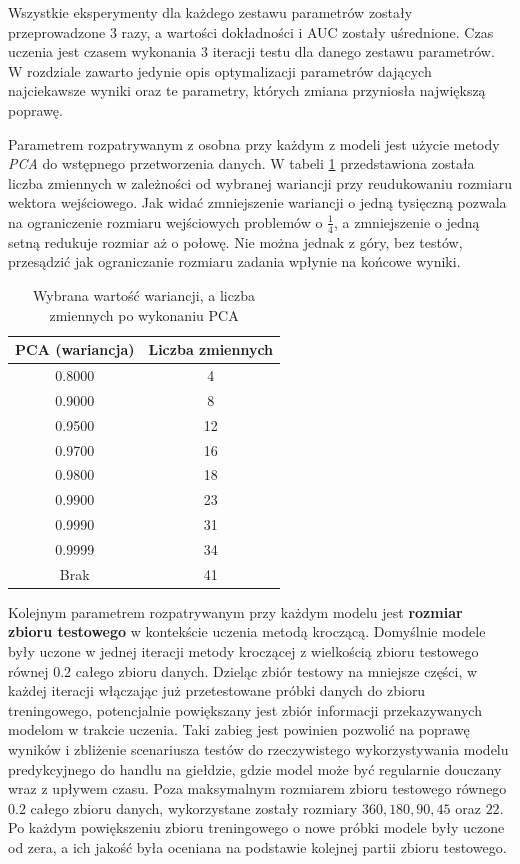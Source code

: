 \documentclass[a4paper, twoside, 11pt, openright]{article}
\begin{document}
Wszystkie eksperymenty dla każdego zestawu parametrów zostały przeprowadzone 3 razy, a wartości dokładności i AUC zostały uśrednione. Czas uczenia jest czasem wykonania 3 iteracji testu dla danego zestawu parametrów. W rozdziale zawarto jedynie opis optymalizacji parametrów dających najciekawsze wyniki oraz te parametry, których zmiana przyniosła największą poprawę.

\bigskip

Parametrem rozpatrywanym z osobna przy każdym z modeli jest użycie metody \textit{PCA} do wstępnego przetworzenia danych. W tabeli \ref{tab:pca_component_number} przedstawiona została liczba zmiennych w zależności od wybranej wariancji przy reudukowaniu rozmiaru wektora wejściowego. Jak widać zmniejszenie wariancji o jedną tysięczną pozwala na ograniczenie rozmiaru wejściowych problemów o $\frac{1}{4}$, a zmniejszenie o jedną setną redukuje rozmiar aż o połowę. Nie można jednak z góry, bez testów, przesądzić jak ograniczanie rozmiaru zadania wpłynie na końcowe wyniki. 


\begin{table}[H]
    \centering
    \begin{tabular}{|c|c|}
    \hline
        \textbf{PCA (wariancja)} & \textbf{Liczba zmiennych} \\ \hline
        0.8000 & 4 \\ \hline 
        0.9000 & 8 \\ \hline 
        0.9500 & 12 \\ \hline 
        0.9700 & 16 \\ \hline 
        0.9800 & 18 \\ \hline 
        0.9900 & 23 \\ \hline
        0.9990 & 31 \\ \hline 
        0.9999 & 34 \\ \hline 
        Brak & 41 \\ \hline 
    \end{tabular}
    \caption{Wybrana wartość wariancji, a liczba zmiennych po wykonaniu PCA}
    \label{tab:pca_component_number}
\end{table}

\bigskip

Kolejnym parametrem rozpatrywanym przy każdym modelu jest \textbf{rozmiar zbioru testowego} w kontekście uczenia metodą kroczącą. Domyślnie modele były uczone w jednej iteracji metody kroczącej z wielkością zbioru testowego równej $0.2$ całego zbioru danych. Dzieląc zbiór testowy na mniejsze części, w każdej iteracji włączając już przetestowane próbki danych do zbioru treningowego, potencjalnie powiększany jest zbiór informacji przekazywanych modelom w trakcie uczenia. Taki zabieg jest powinien pozwolić na poprawę wyników i zbliżenie scenariusza testów do rzeczywistego wykorzystywania modelu predykcyjnego do handlu na giełdzie, gdzie model może być regularnie douczany wraz z upływem czasu. Poza maksymalnym rozmiarem zbioru testowego równego $0.2$ całego zbioru danych, wykorzystane zostały rozmiary $360, 180, 90, 45$ oraz $22$. Po każdym powiększeniu zbioru treningowego o nowe próbki modele były uczone od zera, a ich jakość była oceniana na podstawie kolejnej partii zbioru testowego.
\end{document}
